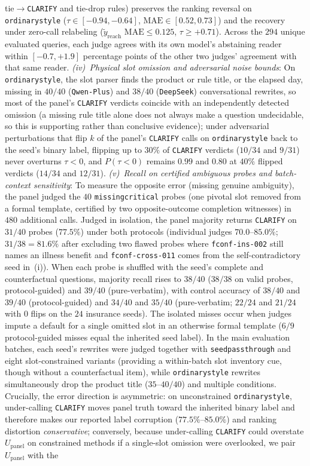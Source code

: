 \documentclass[10pt,twocolumn]{article}
\renewcommand{\_}{\textunderscore\allowbreak}
\begin{document}
tie$\to$\texttt{CLARIFY} and tie-drop rules) preserves the ranking reversal on \texttt{ordinary\_style} ($\tau \in [-0.94, -0.64]$, $\text{MAE} \in [0.52, 0.73]$) and the recovery under zero-call relabeling ($\tilde{y}_{\text{reach}}$ $\text{MAE} \le 0.125$, $\tau \ge +0.71$). Across the $294$ unique evaluated queries, each judge agrees with its own model's abstaining reader within $[-0.7, +1.9]$ percentage points of the other two judges' agreement with that same reader. \emph{(iv)~Physical slot omission and adversarial noise bounds}: On \texttt{ordinary\_style}, the slot parser finds the product or rule title, or the elapsed day, missing in $40/40$ (\texttt{Qwen-Plus}) and $38/40$ (\texttt{DeepSeek}) conversational rewrites, so most of the panel's \texttt{CLARIFY} verdicts coincide with an independently detected omission (a missing rule title alone does not always make a question undecidable, so this is supporting rather than conclusive evidence); under adversarial perturbations that flip $k$ of the panel's \texttt{CLARIFY} calls on \texttt{ordinary\_style} back to the seed's binary label, flipping up to $30\%$ of \texttt{CLARIFY} verdicts ($10/34$ and $9/31$) never overturns $\tau < 0$, and $P(\tau < 0)$ remains $0.99$ and $0.80$ at $40\%$ flipped verdicts ($14/34$ and $12/31$). \emph{(v)~Recall on certified ambiguous probes and batch-context sensitivity}: To measure the opposite error (missing genuine ambiguity), the panel judged the $40$ \texttt{missing\_critical} probes (one pivotal slot removed from a formal template, certified by two opposite-outcome completion witnesses) in $480$ additional calls. Judged in isolation, the panel majority returns \texttt{CLARIFY} on $31/40$ probes ($77.5\%$) under both protocols (individual judges $70.0$--$85.0\%$; $31/38 = 81.6\%$ after excluding two flawed probes where \texttt{fconf-ins-002} still names an illness benefit and \texttt{fconf-cross-011} comes from the self-contradictory seed in~(i)). When each probe is shuffled with the seed's complete and counterfactual questions, majority recall rises to $38/40$ ($38/38$ on valid probes, protocol-guided) and $39/40$ (pure-verbatim), with control accuracy of $38/40$ and $39/40$ (protocol-guided) and $34/40$ and $35/40$ (pure-verbatim; $22/24$ and $21/24$ with $0$ flips on the $24$ insurance seeds). The isolated misses occur when judges impute a default for a single omitted slot in an otherwise formal template ($6/9$ protocol-guided misses equal the inherited seed label). In the main evaluation batches, each seed's rewrites were judged together with \texttt{seed\_passthrough} and eight slot-constrained variants (providing a within-batch slot inventory cue, though without a counterfactual item), while \texttt{ordinary\_style} rewrites simultaneously drop the product title ($35\text{--}40/40$) and multiple conditions. Crucially, the error direction is asymmetric: on unconstrained \texttt{ordinary\_style}, under-calling \texttt{CLARIFY} moves panel truth toward the inherited binary label and therefore makes our reported label corruption ($77.5\%\text{--}85.0\%$) and ranking distortion \emph{conservative}; conversely, because under-calling \texttt{CLARIFY} could overstate $U_{\text{panel}}$ on constrained methods if a single-slot omission were overlooked, we pair $U_{\text{panel}}$ with the 
\end{document}
